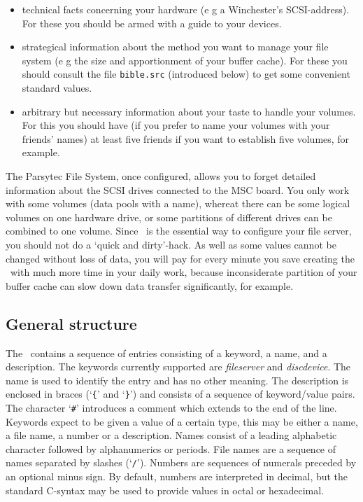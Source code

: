 \begin{itemize}

  \item technical facts concerning your hardware (e g a Winchester's 
        SCSI-address). For these you should be armed with a guide to your
        devices.

  \item strategical information about the method you want to manage your 
        file system (e g the size and apportionment of your buffer cache). For 
        these you should consult the file {\tt bible.src} (introduced below)
        to get some convenient standard values.

  \item arbitrary but necessary information about your taste to handle your 
        volumes. For this you should have (if you prefer to name your volumes 
        with your friends' names) at least five friends if you
        want to establish five volumes, for example.

\end{itemize}

\begin{note}
  The Parsytec File System, once configured, allows you to forget detailed
  information about the SCSI drives connected to the MSC board. You only work
  with some volumes (data pools with a name), whereat there can be some
  logical volumes on one hardware drive, or some partitions of different
  drives can be combined to one volume. Since \DI\ is the essential way to
  configure your file server, you should not do a `quick and dirty'-hack. As
  well as some values cannot be changed without loss of data, you will pay for
  every minute you save creating the \DI\ with much more time in your daily
  work, because inconsiderate partition of your buffer cache can slow down
  data transfer significantly, for example.
\end{note}

\subsection{General structure}

The \DI\ contains a sequence of entries consisting of a keyword, a name, and
a description. The keywords currently supported are {\it fileserver} and
{\it discdevice}. The name is used to identify the entry and has no other meaning.
The description is enclosed in braces (`\verb|{|' and
`\verb|}|'\index{$\lbrace \rbrace$}) and consists of a sequence of
keyword\slash value pairs. The character `{\tt \#}'\index{\#} introduces a
comment which extends to the end of the line. Keywords expect to be given a
value of a certain type, this may be either a name, a file name, a number or
a description. Names consist of a leading alphabetic character followed by
alphanumerics or periods. File names are a sequence of names separated
by slashes (`{\tt /}'\index{/}). Numbers are sequences of numerals preceded by 
an optional minus sign\index{-}. By default, numbers are interpreted in decimal,
but the standard C-syntax may be used to provide values in octal or 
hexadecimal.

